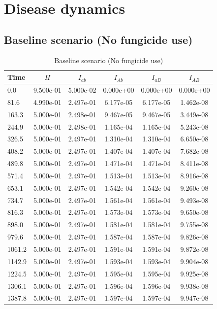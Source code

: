 \documentclass{report}
\begin{document}
\chapter{Disease dynamics}
\section{Baseline scenario (No fungicide use)}
\begin{table}[htbp]
\centering
\caption{Baseline scenario (No fungicide use)}
\label{tab:baseline_no_fungicide}
\begin{tabular}{lccccc}
\toprule
Time & $H$ & $I_{ab}$ & $I_{Ab}$ & $I_{aB}$ & $I_{AB}$ \\
\midrule
0.0 & 9.500e-01 & 5.000e-02 & 0.000e+00 & 0.000e+00 & 0.000e+00 \\
81.6 & 4.990e-01 & 2.497e-01 & 6.177e-05 & 6.177e-05 & 1.462e-08 \\
163.3 & 5.000e-01 & 2.498e-01 & 9.467e-05 & 9.467e-05 & 3.449e-08 \\
244.9 & 5.000e-01 & 2.498e-01 & 1.165e-04 & 1.165e-04 & 5.243e-08 \\
326.5 & 5.000e-01 & 2.497e-01 & 1.310e-04 & 1.310e-04 & 6.650e-08 \\
408.2 & 5.000e-01 & 2.497e-01 & 1.407e-04 & 1.407e-04 & 7.682e-08 \\
489.8 & 5.000e-01 & 2.497e-01 & 1.471e-04 & 1.471e-04 & 8.411e-08 \\
571.4 & 5.000e-01 & 2.497e-01 & 1.513e-04 & 1.513e-04 & 8.916e-08 \\
653.1 & 5.000e-01 & 2.497e-01 & 1.542e-04 & 1.542e-04 & 9.260e-08 \\
734.7 & 5.000e-01 & 2.497e-01 & 1.561e-04 & 1.561e-04 & 9.493e-08 \\
816.3 & 5.000e-01 & 2.497e-01 & 1.573e-04 & 1.573e-04 & 9.650e-08 \\
898.0 & 5.000e-01 & 2.497e-01 & 1.581e-04 & 1.581e-04 & 9.755e-08 \\
979.6 & 5.000e-01 & 2.497e-01 & 1.587e-04 & 1.587e-04 & 9.826e-08 \\
1061.2 & 5.000e-01 & 2.497e-01 & 1.591e-04 & 1.591e-04 & 9.872e-08 \\
1142.9 & 5.000e-01 & 2.497e-01 & 1.593e-04 & 1.593e-04 & 9.904e-08 \\
1224.5 & 5.000e-01 & 2.497e-01 & 1.595e-04 & 1.595e-04 & 9.925e-08 \\
1306.1 & 5.000e-01 & 2.497e-01 & 1.596e-04 & 1.596e-04 & 9.938e-08 \\
1387.8 & 5.000e-01 & 2.497e-01 & 1.597e-04 & 1.597e-04 & 9.947e-08 \\

\end{tabular}
\end{table}
\end{document}
